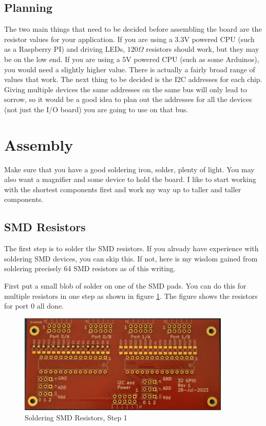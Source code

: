 \documentclass[10pt, openany]{book}
\begin{document}
\subsection{Planning}
The two main things that need to be decided before assembling the board are the resistor values for your application.  If you are using a 3.3V powered CPU (such as a Raspberry PI) and driving LEDs, $120\Omega$ resistors should work, but they may be on the low end.  If you are using a 5V powered CPU (such as some Arduinos), you would need a slightly higher value.  There is actually a fairly broad range of values that work.  The next thing to be decided is the I2C addresses for each chip.  Giving multiple devices the same addresses on the same bus will only lead to sorrow, so it would be a good idea to plan out the addresses for all the devices (not just the I/O board) you are going to use on that bus.

\section{Assembly}
Make sure that you have a good soldering iron, solder, plenty of light.  You may also want a magnifier and some device to hold the board.  I like to start working with the shortest components first and work my way up to taller and taller components.

\subsection{SMD Resistors}
The first step is to solder the SMD resistors.  If you already have experience with soldering SMD devices, you can skip this.  If not, here is my wisdom gained from soldering precisely 64 SMD resistors as of this writing.

First put a small blob of solder on one of the SMD pads.  You can do this for multiple resistors in one step as shown in figure \ref{fig:SMD-1}.  The figure shows the resistors for port 0 all done.

\begin{figure}[ht!]
  \centering
  \includegraphics[width=0.9\textwidth]{../Pictures/SMD-1.jpg}
  \caption{Soldering SMD Resistors, Step 1}
  \label{fig:SMD-1}
\end{figure}
\end{document}
